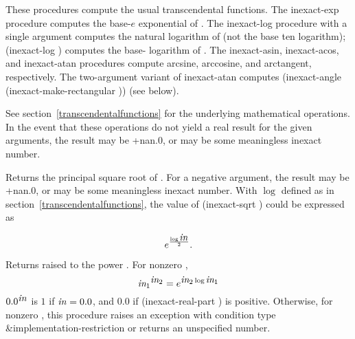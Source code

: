 \begin{entry}{%
}

These procedures compute the usual transcendental functions.  The {\cf
  inexact-exp} procedure computes the base-$e$ exponential of
.  The {\cf inexact-log} procedure with a single argument computes the natural logarithm
of  (not the base ten logarithm); {\cf (inexact-log 
  )} computes the base- logarithm of .
The {\cf inexact-asin}, {\cf inexact-acos}, and {\cf inexact-atan} procedures compute
arcsine, arccosine, and arctangent, respectively.  The two-argument
variant of {\cf inexact-atan} computes {\cf (inexact-angle
  (inexact-make-rectangular  ))} (see below).

See section~\ref{transcendentalfunctions} for the underlying
mathematical operations.  In the event that these operations do not
yield a real result for the given arguments, the result may be {\cf
  +nan.0}, or may be some meaningless inexact number.
\end{entry}

\begin{entry}{%
}

Returns the principal square root of . For a negative argument,
the result may be {\cf +nan.0}, or may be some meaningless inexact
number.  With $\log$ defined as in
section~\ref{transcendentalfunctions}, the value of {\cf (inexact-sqrt
  )} could be expressed as

\begin{displaymath}
e^{\frac{\log \var{in}}{2}}.
\end{displaymath}
\end{entry}

\begin{entry}{%
}

Returns  raised to the power .  For nonzero
,
%
\begin{displaymath}
  \vari{in}^{\varii{in}} = e^{\varii{in} \log \vari{in}}
\end{displaymath}
%
$0.0^{\var{in}}$ is $1$ if $\var{in} = 0.0$, and $0.0$ if {\cf
  (inexact-real-part )} is positive.  Otherwise,
for nonzero , this
procedure raises an exception with condition type {\cf\&implementation-restriction} or
returns an unspecified number.
\end{entry}

